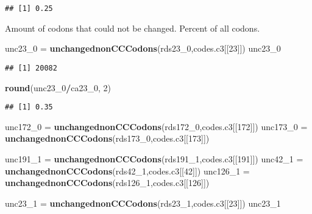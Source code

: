 \documentclass[
]{article}
\newenvironment{Shaded}{\begin{snugshade}}{\end{snugshade}}
\newcommand{\DecValTok}[1]{\textcolor[rgb]{0.00,0.00,0.81}{#1}}
\newcommand{\KeywordTok}[1]{\textcolor[rgb]{0.13,0.29,0.53}{\textbf{#1}}}
\newcommand{\NormalTok}[1]{#1}
\newcommand{\OperatorTok}[1]{\textcolor[rgb]{0.81,0.36,0.00}{\textbf{#1}}}
\newcommand{\StringTok}[1]{\textcolor[rgb]{0.31,0.60,0.02}{#1}}
\begin{document}
\begin{verbatim}
## [1] 0.25
\end{verbatim}

Amount of codons that could not be changed. Percent of all codons.

\begin{Shaded}
\begin{Highlighting}[]
\NormalTok{unc23_}\DecValTok{0}\NormalTok{ =}\StringTok{ }\KeywordTok{unchangednonCCCodons}\NormalTok{(rds23_}\DecValTok{0}\NormalTok{,codes.c3[[}\DecValTok{23}\NormalTok{]])}
\NormalTok{unc23_}\DecValTok{0}
\end{Highlighting}
\end{Shaded}

\begin{verbatim}
## [1] 20082
\end{verbatim}

\begin{Shaded}
\begin{Highlighting}[]
\KeywordTok{round}\NormalTok{(unc23_}\DecValTok{0}\OperatorTok{/}\NormalTok{ca23_}\DecValTok{0}\NormalTok{, }\DecValTok{2}\NormalTok{)}
\end{Highlighting}
\end{Shaded}

\begin{verbatim}
## [1] 0.35
\end{verbatim}

\begin{Shaded}
\begin{Highlighting}[]
\NormalTok{unc172_}\DecValTok{0}\NormalTok{ =}\StringTok{ }\KeywordTok{unchangednonCCCodons}\NormalTok{(rds172_}\DecValTok{0}\NormalTok{,codes.c3[[}\DecValTok{172}\NormalTok{]])}
\NormalTok{unc173_}\DecValTok{0}\NormalTok{ =}\StringTok{ }\KeywordTok{unchangednonCCCodons}\NormalTok{(rds173_}\DecValTok{0}\NormalTok{,codes.c3[[}\DecValTok{173}\NormalTok{]])}

\NormalTok{unc191_}\DecValTok{1}\NormalTok{ =}\StringTok{ }\KeywordTok{unchangednonCCCodons}\NormalTok{(rds191_}\DecValTok{1}\NormalTok{,codes.c3[[}\DecValTok{191}\NormalTok{]])}
\NormalTok{unc42_}\DecValTok{1}\NormalTok{ =}\StringTok{ }\KeywordTok{unchangednonCCCodons}\NormalTok{(rds42_}\DecValTok{1}\NormalTok{,codes.c3[[}\DecValTok{42}\NormalTok{]])}
\NormalTok{unc126_}\DecValTok{1}\NormalTok{ =}\StringTok{ }\KeywordTok{unchangednonCCCodons}\NormalTok{(rds126_}\DecValTok{1}\NormalTok{,codes.c3[[}\DecValTok{126}\NormalTok{]])}

\NormalTok{unc23_}\DecValTok{1}\NormalTok{ =}\StringTok{ }\KeywordTok{unchangednonCCCodons}\NormalTok{(rds23_}\DecValTok{1}\NormalTok{,codes.c3[[}\DecValTok{23}\NormalTok{]])}
\NormalTok{unc23_}\DecValTok{1}
\end{Highlighting}
\end{Shaded}
\end{document}
